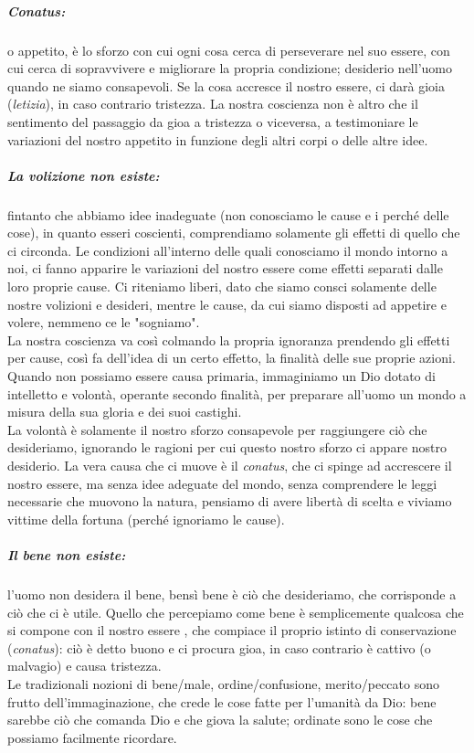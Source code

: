 \subparagraph{Conatus:} o appetito, è lo sforzo con cui ogni cosa cerca di perseverare nel suo essere, con cui cerca di sopravvivere e migliorare la propria condizione; desiderio nell'uomo quando ne siamo consapevoli. Se la cosa accresce il nostro essere, ci darà gioia (\textit{letizia}), in caso contrario tristezza. La nostra coscienza non è altro che il sentimento del passaggio da gioa a tristezza o viceversa, a testimoniare le variazioni del nostro appetito in funzione degli altri corpi o delle altre idee.
\subparagraph{La volizione non esiste:}fintanto che abbiamo idee inadeguate (non conosciamo le cause e i perché delle cose), in quanto esseri coscienti, comprendiamo solamente gli effetti di quello che ci circonda. Le condizioni all'interno delle quali conosciamo il mondo intorno a noi, ci fanno apparire le variazioni del nostro essere come effetti separati dalle loro proprie cause. Ci riteniamo liberi, dato che siamo consci solamente delle nostre volizioni e desideri, mentre le cause, da cui siamo disposti ad appetire e volere, nemmeno ce le "sogniamo".\\
La nostra coscienza va così colmando la propria ignoranza prendendo gli effetti per cause, così fa dell'idea di un certo effetto, la finalità delle sue proprie azioni. Quando non possiamo essere causa primaria, immaginiamo un Dio dotato di intelletto e volontà, operante secondo finalità, per preparare all'uomo un mondo a misura della sua gloria e dei suoi castighi.\\
La volontà è solamente il nostro sforzo consapevole per raggiungere ciò che desideriamo, ignorando le ragioni per cui questo nostro sforzo ci appare nostro desiderio. La vera causa che ci muove è il \textit{conatus}, che ci spinge ad accrescere il nostro essere, ma senza idee adeguate del mondo, senza comprendere le leggi necessarie che muovono la natura, pensiamo di avere libertà di scelta e viviamo vittime della fortuna (perché ignoriamo le cause).
\subparagraph{Il bene non esiste:}l'uomo non desidera il bene, bensì bene è ciò che desideriamo, che corrisponde a ciò che ci è utile. Quello che percepiamo come bene è semplicemente qualcosa che si compone con il nostro essere , che compiace il proprio istinto di conservazione (\textit{conatus}): ciò è detto buono e ci procura gioa, in caso contrario è cattivo (o malvagio) e causa tristezza.\\
Le tradizionali nozioni di bene/male, ordine/confusione, merito/peccato sono frutto dell'immaginazione, che crede le cose fatte per l'umanità da Dio: bene sarebbe ciò che comanda Dio e che giova la salute; ordinate sono le cose che possiamo facilmente ricordare.\\
